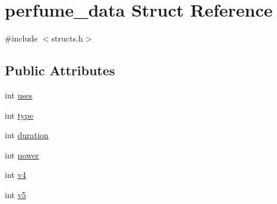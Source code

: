 \hypertarget{structperfume__data}{\section{perfume\-\_\-data Struct Reference}
\label{structperfume__data}
}


{\ttfamily \#include $<$structs.\-h$>$}

\subsection*{Public Attributes}
\begin{DoxyCompactItemize}
\item 
int \hyperlink{structperfume__data_abd44f553157c34ce18af6876c89960c4}{uses}
\item 
int \hyperlink{structperfume__data_a7ecadab65c8d45a95ebda20b74bb5bde}{type}
\item 
int \hyperlink{structperfume__data_a526f9cb6959dfc909bdfc4910400c678}{duration}
\item 
int \hyperlink{structperfume__data_a3ab57bd4c3213b26186b463eb05b3964}{power}
\item 
int \hyperlink{structperfume__data_ad488be1925bcd5a83f8aaddd81957967}{v4}
\item 
int \hyperlink{structperfume__data_a6909dc4467b01c80d5173394556c26fc}{v5}
\end{DoxyCompactItemize}


